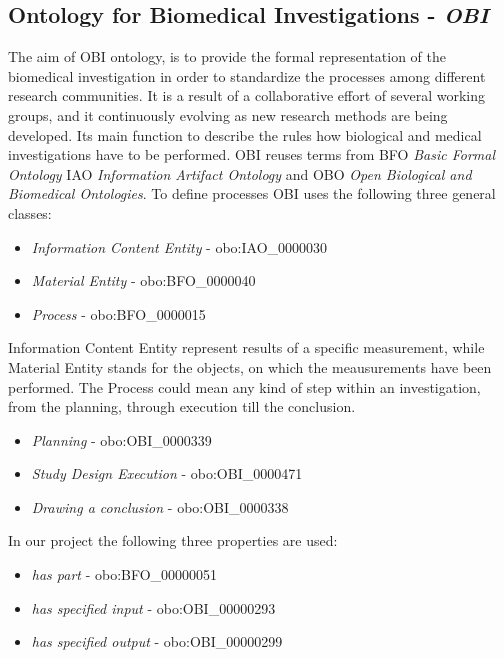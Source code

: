 \subsection{Ontology for Biomedical Investigations - \textit{OBI}} 


The aim of OBI ontology, is to provide the formal representation of the biomedical investigation in order to standardize the processes among different research communities. It is a result of a collaborative effort of several working groups, and it continuously evolving as new research methods are being developed. Its main function to describe the rules how biological and medical investigations have to be performed. OBI reuses terms from BFO \textit{Basic Formal Ontology} IAO \textit{Information Artifact Ontology} and  OBO \textit{Open Biological and Biomedical Ontologies}\cite{10.1371/journal.pone.0154556}. To define processes OBI uses the following three general classes:

\begin{itemize}
	\item  \textit{Information Content Entity} - obo:IAO\_0000030
	\item  \textit{Material Entity} - obo:BFO\_0000040
	\item  \textit{Process} - obo:BFO\_0000015
\end{itemize}

Information Content Entity represent results of a specific measurement, while Material Entity stands for the objects, on which the meausurements have been performed. 
The Process could mean any kind of step within an investigation, from the planning, through execution till the conclusion.

\begin{itemize}
	\item  \textit{Planning} - obo:OBI\_0000339
	\item  \textit{Study Design Execution} - obo:OBI\_0000471
	\item  \textit{Drawing a conclusion} - obo:OBI\_0000338
\end{itemize}


In our project the following three properties are used:

\begin{itemize}
	\item  \textit{has part} - obo:BFO\_00000051
	\item  \textit{has specified input} - obo:OBI\_00000293
	\item  \textit{has specified output} - obo:OBI\_00000299
\end{itemize}


